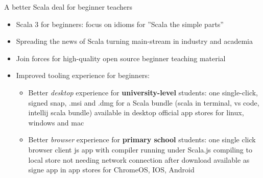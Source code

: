 \documentclass[aspectratio=169]{beamer}
\newcommand{\EndSlide}{\begin{frame}[plain]\endpage\end{frame}}
\newenvironment{Slide}[1]%
  {\begin{frame}[environment=Slide]{#1}}
  {\end{frame}}%
\begin{document}
\begin{Slide}{A better Scala deal for beginner teachers}
  \begin{itemize}
    \item Scala 3 for beginners: focus on idioms for ''Scala the simple parts''
    \item Spreading the news of Scala turning main-stream in industry and academia
    \item Join forces for high-quality open source beginner teaching material
    \item Improved tooling experience for beginners: 
    \begin{itemize}
      \item Better \textit{desktop} experience for \textbf{university-level} students: one single-click, signed snap, .msi and .dmg for a Scala bundle (scala in terminal, vs code, intellij scala bundle) available in desktop official app stores for linux, windows and mac
      \item Better \textit{browser} experience for \textbf{primary school} students: one single click browser client js app with compiler running under Scala.js compiling to local store not needing network connection after download available as signe app in app stores for ChromeOS, IOS, Android
    \end{itemize}
  \end{itemize}

\end{Slide}

\EndSlide
\end{document}
